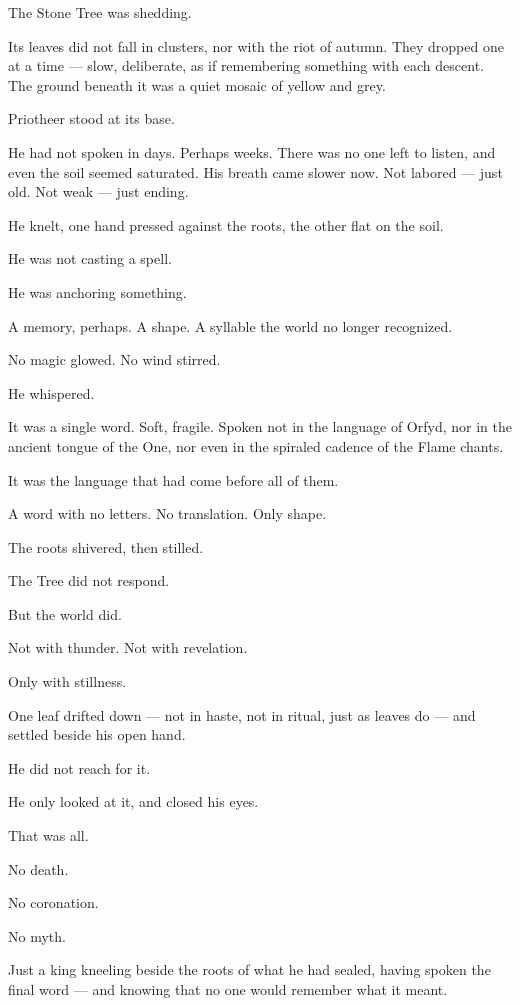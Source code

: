 \documentclass[12pt]{article}
\begin{document}
The Stone Tree was shedding.

Its leaves did not fall in clusters, nor with the riot of autumn. They dropped one at a time — slow, deliberate, as if remembering something with each descent. The ground beneath it was a quiet mosaic of yellow and grey.

Priotheer stood at its base.

He had not spoken in days. Perhaps weeks. There was no one left to listen, and even the soil seemed saturated. His breath came slower now. Not labored — just old. Not weak — just ending.

He knelt, one hand pressed against the roots, the other flat on the soil.

He was not casting a spell.

He was anchoring something.

A memory, perhaps. A shape. A syllable the world no longer recognized.

No magic glowed. No wind stirred.

He whispered.

It was a single word. Soft, fragile. Spoken not in the language of Orfyd, nor in the ancient tongue of the One, nor even in the spiraled cadence of the Flame chants.

It was the language that had come before all of them.

A word with no letters. No translation. Only shape.

The roots shivered, then stilled.

The Tree did not respond.

But the world did.

Not with thunder. Not with revelation.

Only with stillness.

One leaf drifted down — not in haste, not in ritual, just as leaves do — and settled beside his open hand.

He did not reach for it.

He only looked at it, and closed his eyes.

That was all.

No death.

No coronation.

No myth.

Just a king kneeling beside the roots of what he had sealed, having spoken the final word — and knowing that no one would remember what it meant.


\dotfill
\end{document}
